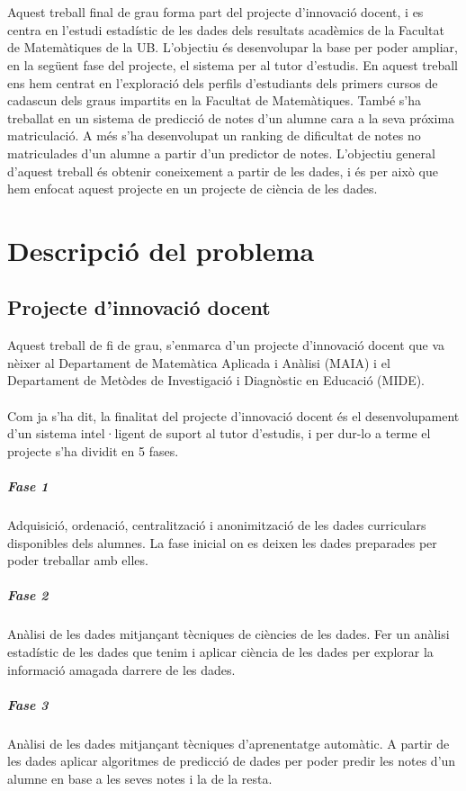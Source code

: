\documentclass[12pt,a4paper,catalan]{article}
\begin{document}
\\
\\
Aquest treball final de grau forma part del projecte d'innovació docent, i es centra en l'estudi estadístic de les dades dels resultats acadèmics de la Facultat de Matemàtiques de la UB. L'objectiu és desenvolupar la base per poder ampliar, en la següent fase del projecte, el sistema per al tutor d'estudis. En aquest treball ens hem centrat en l'exploració dels perfils d'estudiants dels primers cursos de cadascun dels graus impartits en la Facultat de Matemàtiques. També s'ha treballat en un sistema de predicció de notes d'un alumne cara a la seva próxima matriculació. A més s'ha desenvolupat un ranking de dificultat de notes no matriculades d'un alumne a partir d'un predictor de notes. L'objectiu general d'aquest treball és obtenir coneixement a partir de les dades, i és per això que hem enfocat aquest projecte en un projecte de ciència de les dades.


\newpage


\section{Descripció del problema}
\subsection{Projecte d'innovació docent}
Aquest treball de fi de grau, s'enmarca d'un projecte d'innovació docent \cite{pid} que va nèixer al Departament de Matemàtica Aplicada i Anàlisi (MAIA) i el Departament de Metòdes de Investigació i Diagnòstic en Educació (MIDE).
\\
\\
Com ja s'ha dit, la finalitat del projecte d'innovació docent és el desenvolupament d'un sistema intel·ligent de suport al tutor d'estudis, i per dur-lo a terme el projecte s'ha dividit en 5 fases.

\subparagraph{Fase 1}
Adquisició, ordenació, centralització i anonimització de les dades curriculars disponibles dels alumnes. La fase inicial on es deixen les dades preparades per poder treballar amb elles.

\subparagraph{Fase 2}
Anàlisi de les dades mitjançant tècniques de ciències de les dades. Fer un anàlisi estadístic de les dades que tenim i aplicar ciència de les dades per explorar la informació amagada darrere de les dades.

\subparagraph{Fase 3}
Anàlisi de les dades mitjançant tècniques d’aprenentatge automàtic. A partir de les dades aplicar algoritmes de predicció de dades per poder predir les notes d'un alumne en base a les seves notes i la de la resta.
\end{document}

